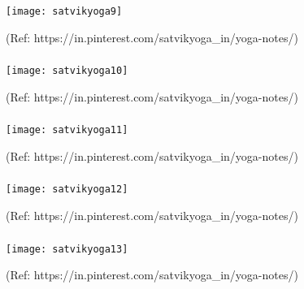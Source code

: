 \begin{frame}[fragile]\frametitle{}

\begin{center}
\texttt{[image: satvikyoga9]}

{\tiny (Ref: https://in.pinterest.com/satvikyoga\_in/yoga-notes/)}
\end{center}

\end{frame}

\begin{frame}[fragile]\frametitle{}

\begin{center}
\texttt{[image: satvikyoga10]}

{\tiny (Ref: https://in.pinterest.com/satvikyoga\_in/yoga-notes/)}
\end{center}

\end{frame}

\begin{frame}[fragile]\frametitle{}

\begin{center}
\texttt{[image: satvikyoga11]}

{\tiny (Ref: https://in.pinterest.com/satvikyoga\_in/yoga-notes/)}
\end{center}

\end{frame}

\begin{frame}[fragile]\frametitle{}

\begin{center}
\texttt{[image: satvikyoga12]}

{\tiny (Ref: https://in.pinterest.com/satvikyoga\_in/yoga-notes/)}
\end{center}

\end{frame}

\begin{frame}[fragile]\frametitle{}

\begin{center}
\texttt{[image: satvikyoga13]}

{\tiny (Ref: https://in.pinterest.com/satvikyoga\_in/yoga-notes/)}
\end{center}

\end{frame}

